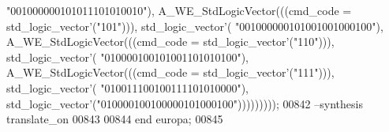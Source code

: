 \begin{DoxyCode}
{      "001000000101011101010010"}\textcolor{vhdlchar}{)}\textcolor{vhdlchar}{,} \textcolor{vhdlchar}{A\_WE\_StdLogicVector}\textcolor{vhdlchar}{(}\textcolor{vhdlchar}{(}\textcolor{vhdlchar}{(}\textcolor{vhdlchar}{cmd_code} \textcolor{vhdlchar}{=} \textcolor{comment}{std\_logic\_vector}\textcolor{vhdlchar}{'}\textcolor{vhdlchar}{(}\textcolor{vhdllogic}{"101"}\textcolor{vhdlchar}{)}\textcolor{vhdlchar}{)}\textcolor{vhdlchar}{)}\textcolor{vhdlchar}{,} \textcolor{comment}{std\_logic\_vector}\textcolor{vhdlchar}{'}\textcolor{vhdlchar}{(}\textcolor{vhdllogic}{
      "001000000101001001000100"}\textcolor{vhdlchar}{)}\textcolor{vhdlchar}{,} \textcolor{vhdlchar}{A\_WE\_StdLogicVector}\textcolor{vhdlchar}{(}\textcolor{vhdlchar}{(}\textcolor{vhdlchar}{(}\textcolor{vhdlchar}{cmd_code} \textcolor{vhdlchar}{=} \textcolor{comment}{std\_logic\_vector}\textcolor{vhdlchar}{'}\textcolor{vhdlchar}{(}\textcolor{vhdllogic}{"110"}\textcolor{vhdlchar}{)}\textcolor{vhdlchar}{)}\textcolor{vhdlchar}{)}\textcolor{vhdlchar}{,} \textcolor{comment}{std\_logic\_vector}\textcolor{vhdlchar}{'}\textcolor{vhdlchar}{(}\textcolor{vhdllogic}{
      "010000100101001101010100"}\textcolor{vhdlchar}{)}\textcolor{vhdlchar}{,} \textcolor{vhdlchar}{A\_WE\_StdLogicVector}\textcolor{vhdlchar}{(}\textcolor{vhdlchar}{(}\textcolor{vhdlchar}{(}\textcolor{vhdlchar}{cmd_code} \textcolor{vhdlchar}{=} \textcolor{comment}{std\_logic\_vector}\textcolor{vhdlchar}{'}\textcolor{vhdlchar}{(}\textcolor{vhdllogic}{"111"}\textcolor{vhdlchar}{)}\textcolor{vhdlchar}{)}\textcolor{vhdlchar}{)}\textcolor{vhdlchar}{,} \textcolor{comment}{std\_logic\_vector}\textcolor{vhdlchar}{'}\textcolor{vhdlchar}{(}\textcolor{vhdllogic}{
      "010011100100111101010000"}\textcolor{vhdlchar}{)}\textcolor{vhdlchar}{,} \textcolor{comment}{std\_logic\_vector}\textcolor{vhdlchar}{'}\textcolor{vhdlchar}{(}\textcolor{vhdllogic}{"010000100100000101000100"}\textcolor{vhdlchar}{)}\textcolor{vhdlchar}{)}\textcolor{vhdlchar}{)}\textcolor{vhdlchar}{)}\textcolor{vhdlchar}{)}\textcolor{vhdlchar}{)}\textcolor{vhdlchar}{)}\textcolor{vhdlchar}{)}\textcolor{vhdlchar}{)};
00842 \textcolor{keyword}{--synthesis translate\_on}
00843 
00844 \textcolor{keywordflow}{end} \textcolor{vhdlchar}{europa};
00845 
\end{DoxyCode}
